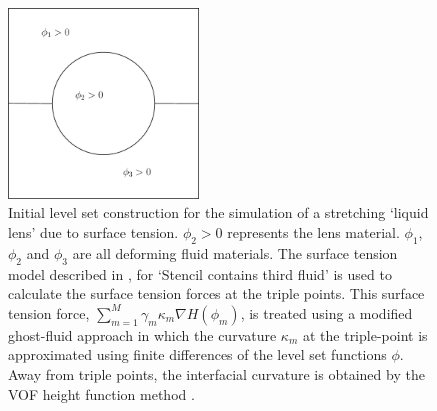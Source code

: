 \documentclass[preprint,12pt]{Definitions/elsarticle}
\begin{document}
\begin{figure}[H]
	\includegraphics[width=0.45\textwidth]{liquidlense.eps}
	\caption{Initial level set construction for the simulation of a stretching `liquid lens' due to surface tension. $\phi_{2}>0$ represents the lens material. $\phi_{1}$, $\phi_{2}$ and $\phi_{3}$ are all deforming fluid materials. The surface tension model described in
		\cite{LiETAL2015IncompressibleMultiphase}, for `Stencil contains third fluid' is used to calculate the surface tension forces at the triple points. This surface tension force, $\sum_{m=1}^{M} \gamma_{m}\kappa_{m}\nabla H(\phi_{m})$, is treated using a modified ghost-fluid approach \cite{fedkiw1999GFM,gibou2002second,sussman2007sharp,liu2005sharp}
		in which the curvature $\kappa_{m}$ at the triple-point is approximated using finite differences of the level set functions $\phi$. Away from triple points, the interfacial curvature is obtained by the VOF height function method \cite{sussman2003second}.
	}
	\label{liquid_lens}
\end{figure}   
\unskip
\end{document}
